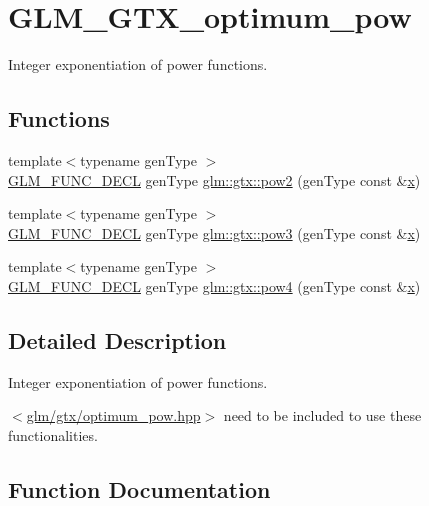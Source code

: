 \hypertarget{group__gtx__optimum__pow}{}\section{G\+L\+M\+\_\+\+G\+T\+X\+\_\+optimum\+\_\+pow}
\label{group__gtx__optimum__pow}


Integer exponentiation of power functions.  


\subsection*{Functions}
\begin{DoxyCompactItemize}
\item 
{\footnotesize template$<$typename gen\+Type $>$ }\\\mbox{\hyperlink{setup_8hpp_ab2d052de21a70539923e9bcbf6e83a51}{G\+L\+M\+\_\+\+F\+U\+N\+C\+\_\+\+D\+E\+CL}} gen\+Type \mbox{\hyperlink{group__gtx__optimum__pow_ga19aaff3213bf23bdec3ef124ace237e9}{glm\+::gtx\+::pow2}} (gen\+Type const \&\mbox{\hyperlink{glad_8h_a92d0386e5c19fb81ea88c9f99644ab1d}{x}})
\item 
{\footnotesize template$<$typename gen\+Type $>$ }\\\mbox{\hyperlink{setup_8hpp_ab2d052de21a70539923e9bcbf6e83a51}{G\+L\+M\+\_\+\+F\+U\+N\+C\+\_\+\+D\+E\+CL}} gen\+Type \mbox{\hyperlink{group__gtx__optimum__pow_ga35689d03cd434d6ea819f1942d3bf82e}{glm\+::gtx\+::pow3}} (gen\+Type const \&\mbox{\hyperlink{glad_8h_a92d0386e5c19fb81ea88c9f99644ab1d}{x}})
\item 
{\footnotesize template$<$typename gen\+Type $>$ }\\\mbox{\hyperlink{setup_8hpp_ab2d052de21a70539923e9bcbf6e83a51}{G\+L\+M\+\_\+\+F\+U\+N\+C\+\_\+\+D\+E\+CL}} gen\+Type \mbox{\hyperlink{group__gtx__optimum__pow_gacef0968763026e180e53e735007dbf5a}{glm\+::gtx\+::pow4}} (gen\+Type const \&\mbox{\hyperlink{glad_8h_a92d0386e5c19fb81ea88c9f99644ab1d}{x}})
\end{DoxyCompactItemize}


\subsection{Detailed Description}
Integer exponentiation of power functions. 

$<$\mbox{\hyperlink{optimum__pow_8hpp}{glm/gtx/optimum\+\_\+pow.\+hpp}}$>$ need to be included to use these functionalities. 

\subsection{Function Documentation}
\mbox{\label{group__gtx__optimum__pow_ga19aaff3213bf23bdec3ef124ace237e9}} 
